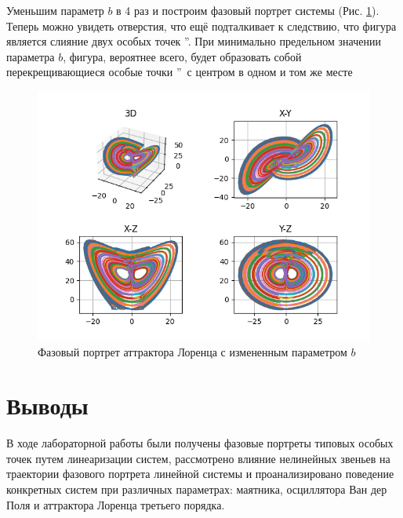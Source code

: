 Уменьшим параметр $b$ в 4 раз и построим фазовый портрет системы (Рис. \ref{fig:23}). 
Теперь можно увидеть отверстия, что ещё подталкивает к следствию, что фигура является слияние двух особых точек \textquotedblright.
При минимально предельном значении параметра $b$, фигура, вероятнее всего, будет образовать собой перекрещивающиеся особые точки
\textquotedblright\ с центром в одном и том же месте

\begin{figure}[H]
	\centering
	\includegraphics[width=0.6\linewidth]{body/images/Lorenz-attractor-type-4.png}
	\caption{Фазовый портрет аттрактора Лоренца с измененным параметром $b$}
	\label{fig:23}
\end{figure}

\pagebreak
\section{Выводы}
В ходе лабораторной работы были получены фазовые портреты типовых особых точек
путем линеаризации систем, рассмотрено влияние нелинейных звеньев на траектории фазового портрета линейной системы
и проанализировано поведение конкретных систем при различных параметрах: 
маятника, осциллятора Ван дер Поля и аттрактора Лоренца третьего порядка.